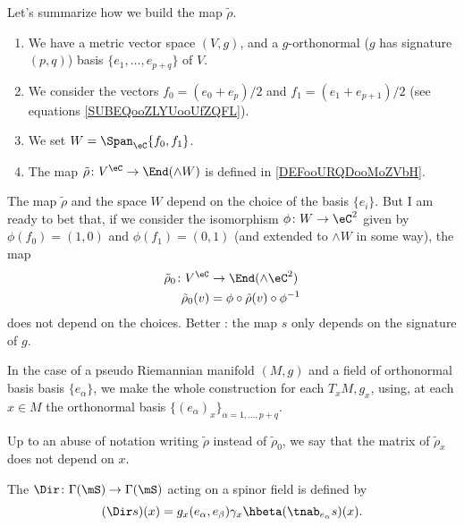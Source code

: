 \begin{normaltext}		\label{NORMooUCULooJVYkzO}
	Let's summarize how we build the map \( \tilde \rho\).
	\begin{enumerate}
		\item
		      We have a metric vector space \( (V,g)\), and a \( g\)-orthonormal (\( g\) has signature \( (p,q)\)) basis \( \{ e_1,\ldots,e_{p+q} \}\) of \( V\).

		\item
		      We consider the vectors \( f_0=(e_0+e_p)/2\) and \( f_1=(e_1+e_{p+1})/2\) (see equations \eqref{SUBEQooZLYUooUfZQFL}).
		\item
		      We set \( W=\Span_{\eC}\{ f_0,f_1 \}\).
		\item
		      The map \(\tilde \rho \colon V^{\eC}\to \End(\wedge W)  \) is defined in \eqref{DEFooURQDooMoZVbH}.
	\end{enumerate}
	The map \( \tilde \rho\) and the space \( W\) depend on the choice of the basis \( \{ e_i \}\). But I am ready to bet that, if we consider the isomorphism \(\phi \colon W\to \eC^2  \) given by \( \phi(f_0)=(1,0)\) and \( \phi(f_1)=(0,1)\) (and extended to \( \wedge W\) in some way), the map
	\begin{equation}
		\begin{aligned}
			\tilde \rho_0\colon V^{\eC} & \to \End(\wedge \eC^2)                 \\
			\tilde \rho_0(v)            & =\phi\circ\tilde \rho(v)\circ\phi^{-1}
		\end{aligned}
	\end{equation}
	does not depend on the choices. Better : the map \( s\) only depends on the signature of \( g\).

	In the case of a pseudo Riemannian manifold \( (M,g)\) and a field of orthonormal basis basis \( \{ e_{\alpha} \}\), we make the whole construction for each \( T_xM, g_x\), using, at each \( x\in M\) the orthonormal basis \( \{ (e_{\alpha})_x \}_{\alpha=1,\ldots,p+q}\).

	Up to an abuse of notation writing \( \tilde \rho\) instead of \( \tilde \rho_0\), we say that the matrix of \( \tilde \rho_x\) does not depend on \( x\).
\end{normaltext}

\begin{definition}		\label{DEFooEGABooZPccEp}
	The  $\Dir\colon \Gamma(\mS)\to \Gamma(\mS)$ acting on a spinor field is defined by
	\begin{equation}\label{dirac}
		(\Dir s)(x)=g_x(e_{\alpha},e_{\beta})\gamma_x\hbeta(\tnab_{e_{\alpha}}s)(x).
	\end{equation}
\end{definition}

